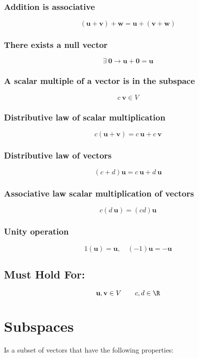 \documentclass{article}
\begin{document}
\subsubsection{Addition is associative} 
\[%
    \left(\mathbf{u}+ \mathbf{v}\right)+\mathbf{w} = \mathbf{u}+
    \left(\mathbf{v}+\mathbf{w}\right)
\]%
\subsubsection{There exists a null vector} 
\[%
    \exists \ \mathbf{0} \rightarrow \mathbf{u}+ \mathbf{0} = \mathbf{u}
\]%
\subsubsection{A scalar multiple of a vector is in the subspace} 
\[%
    c \ \mathbf{v} \in V
\]%
\subsubsection{Distributive law of scalar multiplication} 
\[%
    c \left(\mathbf{u}+ \mathbf{v}\right) = c \ \mathbf{u}+ c \ \mathbf{v}
\]%
\subsubsection{Distributive law of vectors} 
\[%
    (c+d) \mathbf{u} = c \ \mathbf{u} + d \ \mathbf{u}
\]%
\subsubsection{Associative law scalar multiplication of vectors} 
\[%
    c \left(d \ \mathbf{u}\right) = \left(cd\right) \mathbf{u}
\]%
\subsubsection{Unity operation} 
\[%
    1(\mathbf{u}) = \mathbf{u}, \quad (-1)\mathbf{u}=-\mathbf{u}
\]%
\subsection{Must Hold For:} 
\[%
    \mathbf{u}, \mathbf{v} \in V \qquad c,d \in \R
\]%

\clearpage
\section{Subspaces} 

Is a subset of vectors that have the following properties:
\end{document}
